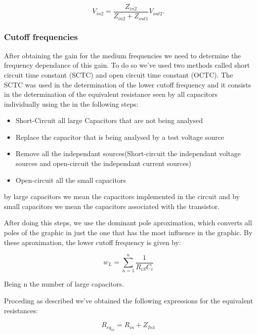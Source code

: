 \begin{equation}
    V_{in2} = \frac{Z_{in2}}{Z_{in2}+Z_{out1}} V_{out2}. 
\end{equation}

\subsubsection{Cutoff frequencies}

After obtaining the gain for the medium frequencies we need to determine the frequency dependance of this gain. To do so we've used two methods called short circuit time constant (SCTC) and open circuit time constant (OCTC). The SCTC was used in the determination of the lower cutoff frequency and it consists in the determination of the equivalent resistance seen by all capacitors individually using the in the following steps:

\begin{itemize}

\item Short-Circuit all large Capacitors that are not being analysed 
\item Replace the capacitor that is being analysed by a test voltage source
\item Remove all the independant sources(Short-circuit the independant voltage sources and open-circuit the independant current sources) 
\item Open-circuit all the small capacitors

\end{itemize}

by large capacitors we mean the capacitors implemented in the circuit and by small capacitors we mean the capacitors associated with the transistor.

After doing this steps, we use the dominant pole aproximation, which converts all poles of the graphic in just the one that has the most influence in the graphic. By these aproximation, the lower cutoff frequency is given by:

\begin{equation}
w_L = \sum_{n = 1}^n \frac{1}{R_{iS}C_i}
\label{wl}
\end{equation} 

Being n the number of large capacitors.

Proceding as described we've obtained the following expressions for the equivalent resistances:

\begin{equation}
R_{eq_{in}} = R_{in} + Z_{In1}
\end{equation} 

